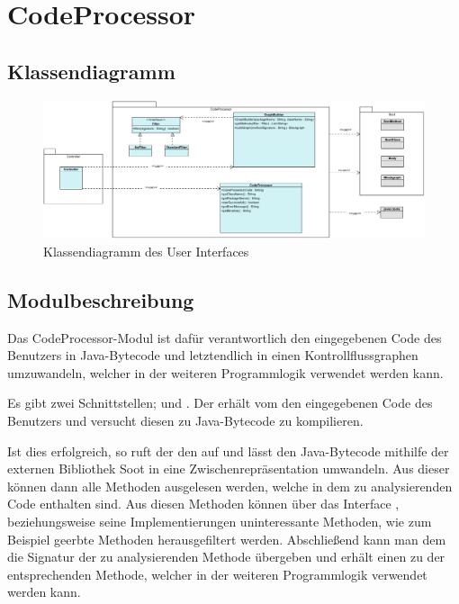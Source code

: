 
\section{CodeProcessor}

\subsection{Klassendiagramm}

\begin{figure}[htbp] 
  \centering
  		 \includegraphics[width=1\textwidth]{Klassenuebersicht/CodeProcessor/CodeProcessor}
  \caption{Klassendiagramm des User Interfaces}
  \label{fig:UI}
\end{figure}

\subsection{Modulbeschreibung}

Das CodeProcessor-Modul ist dafür verantwortlich den eingegebenen Code des Benutzers in Java-Bytecode und letztendlich in einen Kontrollflussgraphen umzuwandeln, welcher in der weiteren Programmlogik verwendet werden kann.

Es gibt zwei Schnittstellen;  und .
Der  erhält vom  den eingegebenen Code des Benutzers und versucht diesen zu Java-Bytecode zu kompilieren.

Ist dies erfolgreich, so ruft der  den  auf und lässt den Java-Bytecode mithilfe der externen Bibliothek Soot in eine Zwischenrepräsentation umwandeln.
Aus dieser können dann alle Methoden ausgelesen werden, welche in dem zu analysierenden Code enthalten sind.
Aus diesen Methoden können über das Interface , beziehungsweise seine Implementierungen uninteressante Methoden, wie zum Beispiel geerbte Methoden herausgefiltert werden.
Abschließend kann man dem  die Signatur der zu analysierenden Methode übergeben und erhält einen  zu der entsprechenden Methode, welcher in der weiteren Programmlogik verwendet werden kann.

